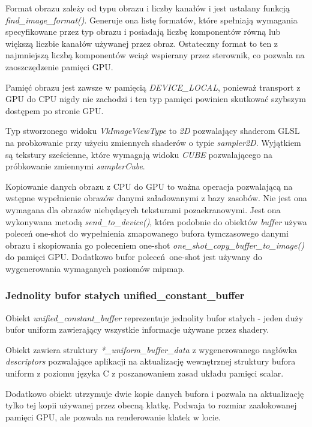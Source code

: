 Format obrazu zależy od typu obrazu i liczby kanałów i jest ustalany funkcją \textit{find\_image\_format()}.
Generuje ona listę formatów, które spełniają wymagania specyfikowane przez typ obrazu i posiadają liczbę komponentów równą lub większą liczbie kanałów używanej przez obraz.
Ostateczny format to ten z najmniejszą liczbą komponentów wciąż wspierany przez sterownik, co pozwala na zaoszczędzenie pamięci GPU.

Pamięć obrazu jest zawsze w pamięcią \textit{DEVICE\_LOCAL}, ponieważ transport z GPU do CPU nigdy nie zachodzi i ten typ pamięci powinien skutkować szybszym dostępem po stronie GPU.

Typ stworzonego widoku \textit{VkImageViewType} to \textit{2D} pozwalający shaderom GLSL na probkowanie przy użyciu zmiennych shaderów o typie \textit{sampler2D}. Wyjątkiem są tekstury sześcienne, które wymagają widoku \textit{CUBE} pozwalającego na próbkowanie zmiennymi \textit{samplerCube}.

Kopiowanie danych obrazu z CPU do GPU to ważna operacja pozwalającą na wstępne wypełnienie obrazów danymi załadowanymi z bazy zasobów. Nie jest ona wymagana dla obrazów niebędących teksturami pozaekranowymi.
Jest ona wykonywana metodą \textit{send\_to\_device()}, która podobnie do obiektów \textit{buffer} używa poleceń one-shot do wypełnienia zmapowanego bufora tymczasowego danymi obrazu i skopiowania go poleceniem one-shot \textit{one\_shot\_copy\_buffer\_to\_image()} do pamięci GPU.
Dodatkowo bufor poleceń one-shot jest używany do wygenerowania wymaganych poziomów mipmap.
 
\subsubsection{Jednolity bufor stałych unified\_constant\_buffer}
Obiekt \textit{unified\_constant\_buffer} reprezentuje jednolity bufor stałych - jeden duży bufor uniform zawierający wszystkie informacje używane przez shadery.

Obiekt zawiera struktury \textit{*\_uniform\_buffer\_data} z wygenerowanego nagłówka \textit{descriptors} pozwalające aplikacji na aktualizację wewnętrznej struktury bufora uniform z poziomu języka C z poszanowaniem zasad układu pamięci scalar.

Dodatkowo obiekt utrzymuje dwie kopie danych bufora i pozwala na aktualizację tylko tej kopii używanej przez obecną klatkę. Podwaja to rozmiar zaalokowanej pamięci GPU, ale pozwala na renderowanie klatek w locie.

